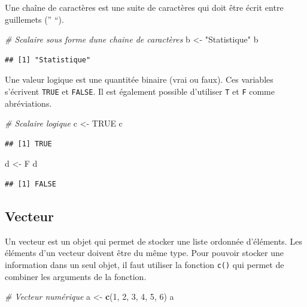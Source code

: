 \documentclass[
]{book}
\newenvironment{Shaded}{\begin{snugshade}}{\end{snugshade}}
\newcommand{\CommentTok}[1]{\textcolor[rgb]{0.56,0.35,0.01}{\textit{#1}}}
\newcommand{\ConstantTok}[1]{\textcolor[rgb]{0.56,0.35,0.01}{#1}}
\newcommand{\DecValTok}[1]{\textcolor[rgb]{0.00,0.00,0.81}{#1}}
\newcommand{\FunctionTok}[1]{\textcolor[rgb]{0.13,0.29,0.53}{\textbf{#1}}}
\newcommand{\NormalTok}[1]{#1}
\newcommand{\OtherTok}[1]{\textcolor[rgb]{0.56,0.35,0.01}{#1}}
\newcommand{\StringTok}[1]{\textcolor[rgb]{0.31,0.60,0.02}{#1}}
\begin{document}
Une chaîne de caractères est une suite de caractères qui doit être écrit entre guillemets ('' ``).

\begin{Shaded}
\begin{Highlighting}[]
\CommentTok{\# Scalaire sous forme d\textquotesingle{}une chaine de caractères}
\NormalTok{b }\OtherTok{\textless{}{-}} \StringTok{"Statistique"}
\NormalTok{b}
\end{Highlighting}
\end{Shaded}

\begin{verbatim}
## [1] "Statistique"
\end{verbatim}

Une valeur logique est une quantitée binaire (vrai ou faux). Ces variables s'écrivent \texttt{TRUE} et \texttt{FALSE}. Il est également possible d'utiliser \texttt{T} et \texttt{F} comme abréviations.

\begin{Shaded}
\begin{Highlighting}[]
\CommentTok{\# Scalaire logique}
\NormalTok{c }\OtherTok{\textless{}{-}} \ConstantTok{TRUE}
\NormalTok{c}
\end{Highlighting}
\end{Shaded}

\begin{verbatim}
## [1] TRUE
\end{verbatim}

\begin{Shaded}
\begin{Highlighting}[]
\NormalTok{d }\OtherTok{\textless{}{-}}\NormalTok{ F}
\NormalTok{d  }
\end{Highlighting}
\end{Shaded}

\begin{verbatim}
## [1] FALSE
\end{verbatim}

\subsection{Vecteur}\label{vecteur}

Un vecteur est un objet qui permet de stocker une liste ordonnée d'éléments. Les éléments d'un vecteur doivent être du même type.
Pour pouvoir stocker une information dans un seul objet, il faut utiliser la fonction \texttt{c()} qui permet de combiner les arguments de la fonction.

\begin{Shaded}
\begin{Highlighting}[]
\CommentTok{\# Vecteur numérique}
\NormalTok{a }\OtherTok{\textless{}{-}} \FunctionTok{c}\NormalTok{(}\DecValTok{1}\NormalTok{, }\DecValTok{2}\NormalTok{, }\DecValTok{3}\NormalTok{, }\DecValTok{4}\NormalTok{, }\DecValTok{5}\NormalTok{, }\DecValTok{6}\NormalTok{)}
\NormalTok{a}
\end{Highlighting}
\end{Shaded}
\end{document}
